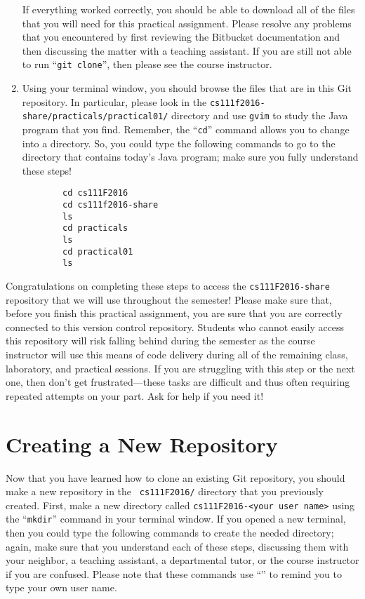 \begin{enumerate}
    If everything worked correctly, you should be able to download all of the files that you will need for this
    practical assignment. Please resolve any problems that you encountered by first reviewing the Bitbucket
    documentation and then discussing the matter with a teaching assistant.  If you are still not able to run ``{\tt git
      clone}'', then please see the course instructor.

  \item Using your terminal window, you should browse the files that are in this Git repository.  In particular, please
    look in the {\tt cs111f2016-share/practicals/practical01/} directory and use {\tt gvim} to study the Java program
    that you find.  Remember, the ``{\tt cd}'' command allows you to change into a directory. So, you could type the
    following commands to go to the directory that contains today's Java program; make sure you fully understand these
    steps!

    \vspace*{-.1in}
    \begin{verbatim}
        cd cs111F2016
        cd cs111f2016-share
        ls
        cd practicals
        ls
        cd practical01
        ls
    \end{verbatim}
    \vspace*{-.5in}

    \end{enumerate}

    Congratulations on completing these steps to access the {\tt cs111F2016-share} repository that we will use
    throughout the semester! Please make sure that, before you finish this practical assignment, you are sure that you
    are correctly connected to this version control repository. Students who cannot easily access this repository will
    risk falling behind during the semester as the course instructor will use this means of code delivery during all of
    the remaining class, laboratory, and practical sessions. If you are struggling with this step or the next one, then
    don't get frustrated---these tasks are difficult and thus often requiring repeated attempts on your part. Ask for
    help if you need it!

\section*{Creating a New Repository}

Now that you have learned how to clone an existing Git repository, you should make a new repository in the {\tt
cs111F2016/} directory that you previously created.  First, make a new directory called {\tt cs111F2016-<your user
name>} using the ``{\tt mkdir}'' command in your terminal window. If you opened a new terminal, then you could type the
following commands to create the needed directory; again, make sure that you understand each of these steps, discussing
them with your neighbor, a teaching assistant, a departmental tutor, or the course instructor if you are confused.
Please note that these commands use ``{\tt <your user name>}'' to remind you to type your own user name.

